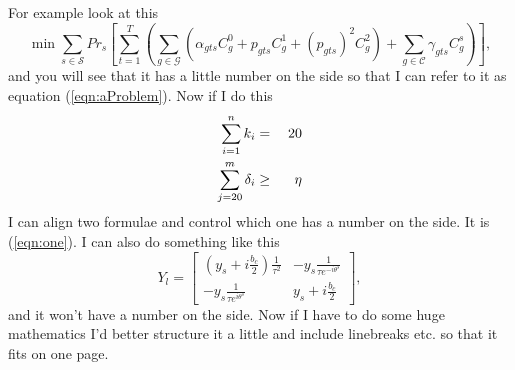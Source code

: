 \documentclass[11pt,twoside]{article}
\numberwithin{Theorem}{section}
\numberwithin{Definition}{section}
\numberwithin{Lemma}{section}
\numberwithin{Algorithm}{section}
\numberwithin{equation}{section}
\begin{document}
For example look at this
\begin{equation}\label{eqn:aProblem}
\min{}\sum_{s\in\mathcal{S}}Pr_{s}\left[\sum_{t=1}^{T}\left(
\sum_{g\in\mathcal{G}}\left(\alpha_{gts}C_{g}^{0}+
p_{gts}C_{g}^{1}+\left(p_{gts}\right)^{2}C_{g}^{2}\right)
+\sum_{g\in\mathcal{C}}\gamma_{gts}C_{g}^{s}\right)\right],
\end{equation}
and you will see that it has a little number on the side so that I can refer to it as equation (\ref{eqn:aProblem}). Now if I do this
\begin{eqnarray}
\sum_{i=1}^{n}k_{i}&=&20\label{eqn:one}\\
\sum_{j=20}^{m}\delta_{i}&\geq{}&\eta{}\notag
\end{eqnarray}
I can align two formulae and control which one has a number on the side. It is (\ref{eqn:one}). I can also do something like this
\begin{displaymath}
Y_{l}=\left[\begin{array}{cc}
             \left(y_{s}+i\frac{b_{c}}{2}\right)\frac{1}{\tau{}^{2}} &
             -y_{s}\frac{1}{\tau{}e^{-i\theta^{s}}}\\
             -y_{s}\frac{1}{\tau{}e^{i\theta^{s}}} &
             y_{s}+i\frac{b_{c}}{2}
             \end{array}\right],
\end{displaymath}
and it won't have a number on the side. Now if I have to do some huge mathematics I'd better structure it a little and include linebreaks etc. so that it fits on one page.
\end{document}
